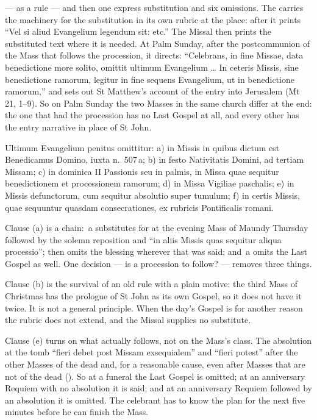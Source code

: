  --- as a rule --- and then one express substitution and six
omissions. The  carries the machinery for the substitution
in its own rubric at the place: after  it prints ``Vel si aliud Evangelium legendum sit:  etc.'' The Missal then prints the substituted text where it
is needed. At Palm Sunday, after the postcommunion of the Mass that follows the
procession, it directs: ``Celebrans, in fine Missae, data benedictione more
solito, omittit ultimum Evangelium \dots{} In ceteris Missis, sine benedictione
ramorum, legitur in fine sequens Evangelium, ut in benedictione ramorum,'' and
sets out St Matthew's account of the entry into Jerusalem (Mt 21, 1--9). So on
Palm Sunday the two Masses in the same church differ at the end: the one that
had the procession has no Last Gospel at all, and every other has the entry
narrative in place of St John.

\begin{rulebox}{}
Ultimum Evangelium penitus omittitur: a) in Missis in quibus dictum est
Benedicamus Domino, iuxta n.~507\,a; b) in festo Nativitatis Domini, ad
tertiam Missam; c) in dominica II Passionis seu in palmis, in Missa quae
sequitur benedictionem et processionem ramorum; d) in Missa Vigiliae
paschalis; e) in Missis defunctorum, cum sequitur absolutio super tumulum; f)
in certis Missis, quae sequuntur quasdam consecrationes, ex rubricis
Pontificalis romani.
\end{rulebox}

Clause (a) is a chain: \,a substitutes  for
 at the evening Mass of Maundy Thursday followed by the
solemn reposition and ``in aliis Missis quas sequitur aliqua processio'';
 then omits the blessing wherever that was said; and \,a
omits the Last Gospel as well. One decision --- is a procession to follow? ---
removes three things.

Clause (b) is the survival of an old rule with a plain motive: the third Mass
of Christmas has the prologue of St John as its own Gospel, so it does not have
it twice. It is not a general principle. When the day's Gospel is
 for another reason the rubric does not extend, and the
Missal supplies no substitute.

Clause (e) turns on what actually follows, not on the Mass's class. The
absolution at the tomb ``fieri debet post Missam exsequialem'' and ``fieri
potest'' after the other Masses of the dead and, for a reasonable cause, even
after Masses that are not of the dead (). So at a funeral the Last
Gospel is omitted; at an anniversary Requiem with no absolution it is said; and
at an anniversary Requiem followed by an absolution it is omitted. The
celebrant has to know the plan for the next five minutes before he can finish
the Mass.

